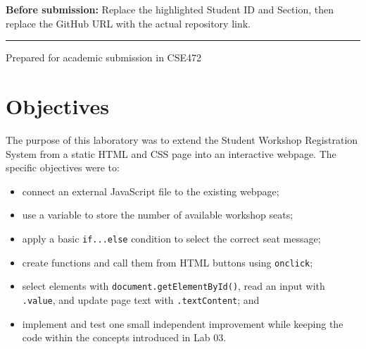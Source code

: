 \documentclass[11pt,a4paper]{article}
\begin{document}
\begin{titlepage}
    \vspace{0.65cm}
    \colorbox{warningbg}{%
        \begin{minipage}{0.94\textwidth}
            \vspace{0.22cm}
            \textcolor{warning}{\textbf{Before submission:}} Replace the highlighted Student ID and Section, then replace the GitHub URL with the actual repository link.
            \vspace{0.22cm}
        \end{minipage}
    }

    \vfill
    {\color{line}\rule{\textwidth}{0.8pt}}\par
    {\small\color{muted}Prepared for academic submission in CSE472}
\end{titlepage}

\setcounter{section}{1}

\section{Objectives}

The purpose of this laboratory was to extend the Student Workshop Registration System from a static HTML and CSS page into an interactive webpage. The specific objectives were to:

\begin{itemize}
    \item connect an external JavaScript file to the existing webpage;
    \item use a variable to store the number of available workshop seats;
    \item apply a basic \texttt{if...else} condition to select the correct seat message;
    \item create functions and call them from HTML buttons using \texttt{onclick};
    \item select elements with \texttt{document.getElementById()}, read an input with \texttt{.value}, and update page text with \texttt{.textContent}; and
    \item implement and test one small independent improvement while keeping the code within the concepts introduced in Lab 03.
\end{itemize}

\end{document}

